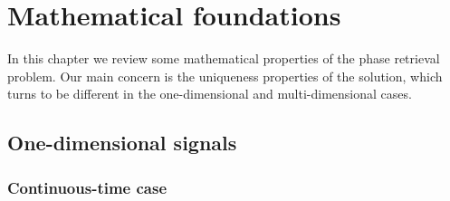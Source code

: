 \chapter{Mathematical foundations}
\label{cha:math-found}

In this chapter we review some mathematical properties of the phase
retrieval problem. Our main concern is the uniqueness properties of the solution,
which turns to be different in the one-dimensional and
multi-dimensional cases.

\section{One-dimensional signals}
\label{sec:one-dimensional-signals}

\subsection{Continuous-time case}
\label{sec:continuous-case}



